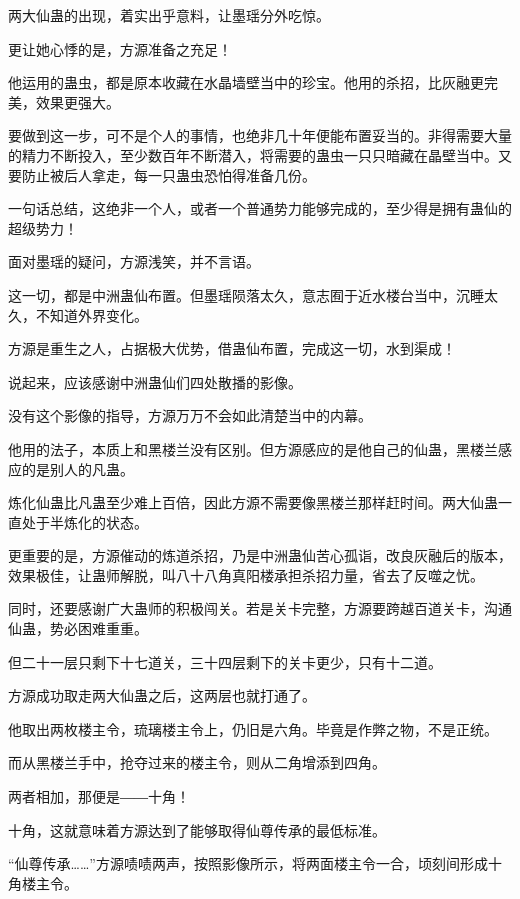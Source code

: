 
\begin{this_body}

两大仙蛊的出现，着实出乎意料，让墨瑶分外吃惊。

更让她心悸的是，方源准备之充足！

他运用的蛊虫，都是原本收藏在水晶墙壁当中的珍宝。他用的杀招，比灰融更完美，效果更强大。

要做到这一步，可不是个人的事情，也绝非几十年便能布置妥当的。非得需要大量的精力不断投入，至少数百年不断潜入，将需要的蛊虫一只只暗藏在晶壁当中。又要防止被后人拿走，每一只蛊虫恐怕得准备几份。

一句话总结，这绝非一个人，或者一个普通势力能够完成的，至少得是拥有蛊仙的超级势力！

面对墨瑶的疑问，方源浅笑，并不言语。

这一切，都是中洲蛊仙布置。但墨瑶陨落太久，意志囿于近水楼台当中，沉睡太久，不知道外界变化。

方源是重生之人，占据极大优势，借蛊仙布置，完成这一切，水到渠成！

说起来，应该感谢中洲蛊仙们四处散播的影像。

没有这个影像的指导，方源万万不会如此清楚当中的内幕。

他用的法子，本质上和黑楼兰没有区别。但方源感应的是他自己的仙蛊，黑楼兰感应的是别人的凡蛊。

炼化仙蛊比凡蛊至少难上百倍，因此方源不需要像黑楼兰那样赶时间。两大仙蛊一直处于半炼化的状态。

更重要的是，方源催动的炼道杀招，乃是中洲蛊仙苦心孤诣，改良灰融后的版本，效果极佳，让蛊师解脱，叫八十八角真阳楼承担杀招力量，省去了反噬之忧。

同时，还要感谢广大蛊师的积极闯关。若是关卡完整，方源要跨越百道关卡，沟通仙蛊，势必困难重重。

但二十一层只剩下十七道关，三十四层剩下的关卡更少，只有十二道。

方源成功取走两大仙蛊之后，这两层也就打通了。

他取出两枚楼主令，琉璃楼主令上，仍旧是六角。毕竟是作弊之物，不是正统。

而从黑楼兰手中，抢夺过来的楼主令，则从二角增添到四角。

两者相加，那便是――十角！

十角，这就意味着方源达到了能够取得仙尊传承的最低标准。

“仙尊传承……”方源啧啧两声，按照影像所示，将两面楼主令一合，顷刻间形成十角楼主令。


\end{this_body}
